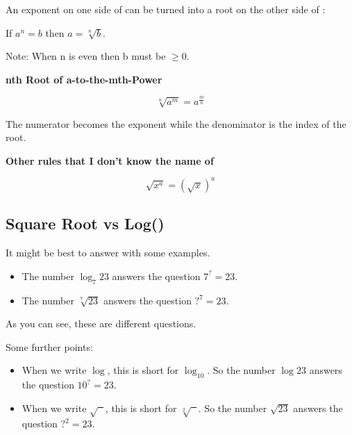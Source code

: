 An exponent on one side of \q{=} can be turned into a root on the other side of \q{=}:

If \(a^{n}=b\) then \(a=\sqrt[n]{b}\).

Note: When n is even then b must be \(\geq 0\).



\vspace{5 mm}

\textbf{nth Root of a-to-the-mth-Power}

\[\sqrt[n]{a^{m}}=a^{\frac{m}{n}}\]

The numerator becomes the exponent while the denominator is the index of the root.

\vspace{5 mm}

\textbf{Other rules that I don't know the name of}

\[\sqrt{x^{a}}= \left( \sqrt{x} \right)^{a}\]

\subsection{Square Root vs Log()}

It might be best to answer with some examples.

\begin{itemize}
  \item The number $\log_7 23$ answers the question $7^{?} = 23$.
  \item The number $\sqrt[7]{23}$ answers the question $?^7 = 23$.
\end{itemize}

As you can see, these are different questions.

Some further points:

\begin{itemize}
  \item When we write $\log$, this is short for $\log_{10}$. So the number $\log 23$ answers the question $10^? = 23$.
  \item When we write $\sqrt{\phantom{x}}$, this is short for $\sqrt[2]{\phantom{x}}$. So the number $\sqrt{23}$ answers the question $?^2 = 23$.
\end{itemize}

